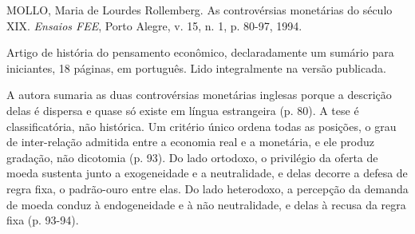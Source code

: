 
\begin{identificacao}
MOLLO, Maria de Lourdes Rollemberg. As controvérsias monetárias do século XIX.
\emph{Ensaios FEE}, Porto Alegre, v. 15, n. 1, p. 80-97, 1994.

Artigo de história do pensamento econômico, declaradamente um sumário para
iniciantes, 18 páginas, em português. Lido integralmente na versão publicada.
\end{identificacao}

A autora sumaria as duas controvérsias monetárias inglesas porque a descrição
delas é dispersa e quase só existe em língua estrangeira (p. 80). A tese é
classificatória, não histórica. Um critério único ordena todas as posições, o
grau de inter-relação admitida entre a economia real e a monetária, e ele produz
gradação, não dicotomia (p. 93). Do lado ortodoxo, o privilégio da oferta de
moeda sustenta junto a exogeneidade e a neutralidade, e delas decorre a defesa
de regra fixa, o padrão-ouro entre elas. Do lado heterodoxo, a percepção da
demanda de moeda conduz à endogeneidade e à não neutralidade, e delas à recusa
da regra fixa (p. 93-94).

